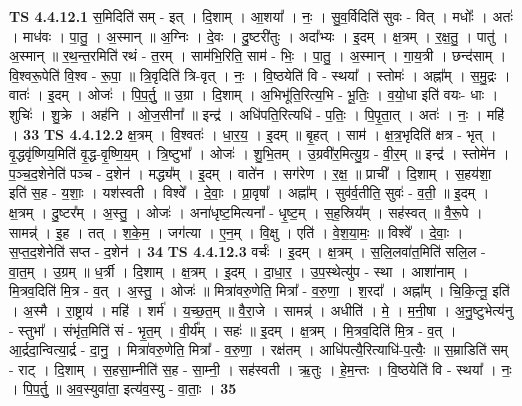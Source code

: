 \documentclass[17pt]{extarticle}
\begin{document}
                                \textbf{ TS 4.4.12.1} \newline
                  स॒मिदिति॑ सम् - इत् । दि॒शाम् । आ॒शया᳚ । नः॒ । सु॒व॒र्विदिति॑ सुवः - वित् । मधोः᳚ । अतः॑ । माध॑वः । पा॒तु॒ । अ॒स्मान् ॥ अ॒ग्निः । दे॒वः । दु॒ष्टरी॑तुः । अदा᳚भ्यः । इ॒दम् । क्ष॒त्रम् । र॒क्ष॒तु॒ । पातु॑ । अ॒स्मान् ॥ र॒थ॒न्त॒रमिति॑ रथं - त॒रम् । साम॑भि॒रिति॒ साम॑ - भिः॒ । पा॒तु॒ । अ॒स्मान् । गा॒य॒त्री । छन्द॑साम् । वि॒श्वरू॒पेति॑ वि॒श्व - रू॒पा॒ ॥ त्रि॒वृदिति॑ त्रि-वृत् । नः॒ । वि॒ष्ठयेति॑ वि - स्थया᳚ । स्तोमः॑ । अह्ना᳚म् । स॒मु॒द्रः । वातः॑ । इ॒दम् । ओजः॑ । पि॒प॒र्तु॒ ॥ उ॒ग्रा । दि॒शाम् । अ॒भिभू॑ति॒रित्य॒भि - भू॒तिः॒ । व॒यो॒धा इति॑ वयः- धाः । शुचिः॑ । शु॒क्रे । अह॑नि । ओ॒ज॒सीना᳚ ॥ इन्द्र॑ । अधि॑पति॒रित्यधि॑ - प॒तिः॒ । पि॒पृ॒ता॒त् । अतः॑ । नः॒ । महि॑ । \textbf{  33} \newline
                  \newline
                                \textbf{ TS 4.4.12.2} \newline
                  क्ष॒त्रम् । वि॒श्वतः॑ । धा॒र॒य॒ । इ॒दम् ॥ बृ॒हत् । साम॑ । क्ष॒त्र॒भृदिति॑ क्षत्र - भृत् । वृ॒द्धवृ॑ष्णिय॒मिति॑ वृ॒द्ध-वृ॒ष्णि॒य॒म् । त्रि॒ष्टुभा᳚ । ओजः॑ । शु॒भि॒तम् । उ॒ग्रवी॑र॒मित्यु॒ग्र - वी॒र॒म् ॥ इन्द्र॑ । स्तोमे॑न । प॒ञ्च॒द॒शेनेति॑ पञ्च - द॒शेन॑ । मद्ध्य᳚म् । इ॒दम् । वाते॑न । सग॑रेण । र॒क्ष॒ ॥ प्राची᳚ । दि॒शाम् । स॒हय॑शा॒ इति॑ स॒ह - य॒शाः॒ । यश॑स्वती । विश्वे᳚ । दे॒वाः॒ । प्रा॒वृषा᳚ । अह्ना᳚म् । सुव॑र्व॒तीति॒ सुवः॑ - व॒ती॒ ॥ इ॒दम् । क्ष॒त्रम् । दु॒ष्टर᳚म् । अ॒स्तु॒ । ओजः॑ । अना॑धृष्ट॒मित्यना᳚ - धृ॒ष्ट॒म् । स॒ह॒स्रिय᳚म् । सह॑स्वत् ॥ वै॒रू॒पे । सामन्न्॑ । इ॒ह । तत् । श॒के॒म॒ । जग॑त्या । ए॒न॒म् । वि॒क्षु । एति॑ । वे॒श॒या॒मः॒ ॥ विश्वे᳚ । दे॒वाः॒ । स॒प्त॒द॒शेनेति॑ सप्त - द॒शेन॑ । \textbf{  34} \newline
                  \newline
                                \textbf{ TS 4.4.12.3} \newline
                  वर्चः॑ । इ॒दम् । क्ष॒त्रम् । स॒लि॒लवा॑त॒मिति॑ सलि॒ल - वा॒त॒म् । उ॒ग्रम् ॥ ध॒र्त्री । दि॒शाम् । क्ष॒त्रम् । इ॒दम् । दा॒धा॒र॒ । उ॒प॒स्थेत्यु॑प - स्था । आशा॑नाम् । मि॒त्रव॒दिति॑ मि॒त्र - व॒त् । अ॒स्तु॒ । ओजः॑ ॥ मित्रा॑वरु॒णेति॒ मित्रा᳚ - व॒रु॒णा॒ । श॒रदा᳚ । अह्ना᳚म् । चि॒कि॒त्नू॒ इति॑ । अ॒स्मै । रा॒ष्ट्राय॑ । महि॑ । शर्म॑ । य॒च्छ॒त॒म् ॥ वै॒रा॒जे । सामन्न्॑ । अधीति॑ । मे॒ । म॒नी॒षा । अ॒नु॒ष्टुभेत्य॑नु - स्तुभा᳚ । संभृ॑त॒मिति॑ सं - भृ॒त॒म् । वी॒र्य᳚म् । सहः॑ ॥ इ॒दम् । क्ष॒त्रम् । मि॒त्रव॒दिति॑ मि॒त्र - व॒त् । आ॒र्द्रदा॒न्वित्या॒र्द्र - दा॒नु॒ । मित्रा॑वरु॒णेति॒ मित्रा᳚ - व॒रु॒णा॒ । रक्ष॑तम् । आधि॑पत्यै॒रित्याधि॑-प॒त्यैः॒ ॥ स॒म्राडिति॑ सम् - राट् । दि॒शाम् । स॒हसा॒म्नीति॑ स॒ह - सा॒म्नी॒ । सह॑स्वती । ऋ॒तुः । हे॒म॒न्तः । वि॒ष्ठयेति॑ वि - स्थया᳚ । नः॒ । पि॒प॒र्तु॒ ॥ अ॒व॒स्युवा॑ता॒ इत्य॑व॒स्यु - वा॒ताः॒ । \textbf{  35} \newline
\end{document}
